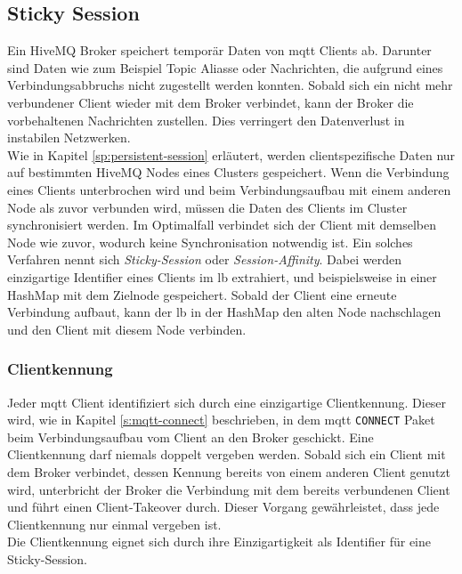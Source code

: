 \subsection{Sticky Session} \label{ss:sticky-session}
Ein HiveMQ Broker speichert temporär Daten von \ac{mqtt} Clients ab.
Darunter sind Daten wie zum Beispiel Topic Aliasse oder Nachrichten, die aufgrund eines Verbindungsabbruchs nicht zugestellt werden konnten.
Sobald sich ein nicht mehr verbundener Client wieder mit dem Broker verbindet, kann der Broker die vorbehaltenen Nachrichten zustellen.
Dies verringert den Datenverlust in instabilen Netzwerken.
\\
Wie in Kapitel \ref{sp:persistent-session} erläutert, werden clientspezifische Daten nur auf bestimmten HiveMQ Nodes eines Clusters gespeichert.
Wenn die Verbindung eines Clients unterbrochen wird und beim Verbindungsaufbau mit einem anderen Node als zuvor verbunden wird, müssen die Daten des Clients im Cluster synchronisiert werden.
Im Optimalfall verbindet sich der Client mit demselben Node wie zuvor, wodurch keine Synchronisation notwendig ist.
Ein solches Verfahren nennt sich \textit{Sticky-Session} oder \textit{Session-Affinity}. Dabei werden einzigartige Identifier eines Clients im \acl{lb} extrahiert, und beispielsweise in einer HashMap mit dem Zielnode gespeichert. Sobald der Client eine erneute Verbindung aufbaut, kann der \acl{lb} in der HashMap den alten Node nachschlagen und den Client mit diesem Node verbinden. \cite{WhatDoesTerm}

\subsubsection{Clientkennung} \label{ss:clientid}
Jeder \ac{mqtt} Client identifiziert sich durch eine einzigartige Clientkennung. Dieser wird, wie in Kapitel \ref{s:mqtt-connect} beschrieben, in dem \ac{mqtt} \verb|CONNECT| Paket beim Verbindungsaufbau vom Client an den Broker geschickt.
Eine Clientkennung darf niemals doppelt vergeben werden. Sobald sich ein Client mit dem Broker verbindet, dessen Kennung bereits von einem anderen Client genutzt wird, unterbricht der Broker die Verbindung mit dem bereits verbundenen Client und führt einen Client-Takeover durch.
Dieser Vorgang gewährleistet, dass jede Clientkennung nur einmal vergeben ist.
\\
Die Clientkennung eignet sich durch ihre Einzigartigkeit als Identifier für eine Sticky-Session.

